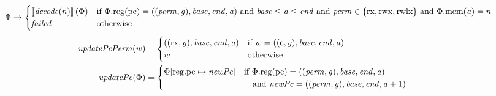 \documentclass[compsoc,conference,letterpaper,fleqn]{IEEEtran}
\newcommand{\update}[2]{[#1 \mapsto #2]}
\newcommand{\sem}[1]{\left\llbracket #1 \right\rrbracket}
\newcommand{\var}[1]{\mathit{#1}}
\newcommand{\gl}{\var{g}}
\newcommand{\pcreg}{\mathrm{pc}}
\newcommand{\addr}{\var{a}}
\newcommand{\start}{\var{base}}
\newcommand{\addrend}{\var{end}}
\newcommand{\perm}{\var{perm}}
\newcommand{\stdcap}[1][(\perm,\gl)]{\left(#1,\start,\addrend,\addr \right)}
\newcommand{\plainproj}[1]{\mathrm{#1}}
\newcommand{\memheap}[1][\Phi]{#1.\plainproj{mem}}
\newcommand{\memreg}[1][\Phi]{#1.\plainproj{reg}}
\newcommand{\updateReg}[3][\Phi]{#1\update{\plainproj{reg}.#2}{#3}}
\newcommand{\failed}{\mathit{failed}}
\newcommand{\plainfun}[2]{
  \ifthenelse{\equal{#2}{}}
  {\mathit{#1}}
  {\mathit{#1}(#2)}
}
\newcommand{\decode}{\plainfun{decode}{}}
\newcommand{\updatePcPerm}[1]{\plainfun{updatePcPerm}{#1}}
\newcommand{\stdUpdatePc}[1]{\plainfun{updatePc}{#1}}
\newcommand{\plainperm}[1]{\mathrm{#1}}
\newcommand{\exec}{\plainperm{rx}}
\newcommand{\entry}{\plainperm{e}}
\newcommand{\rwx}{\plainperm{rwx}}
\newcommand{\rwlx}{\plainperm{rwlx}}
\begin{document}
\begin{figure}
  \centering
  \begin{equation*}
    \Phi  \rightarrow
    \begin{cases}
      \sem{\decode(n)}(\Phi) & \text{if $\memreg(\pcreg) = \stdcap$ and $\start \leq \addr \leq \addrend$ and $\perm \in \{ \exec,\rwx, \rwlx \}$ and $\memheap(\addr) = n$ }\\
      \failed                                 & \text{otherwise}
    \end{cases}
  \end{equation*}\vspace{-.3cm}%
  \begin{align*}
    \updatePcPerm{w} &=
                       \begin{cases}
                         ((\exec,\gl),\start,\addrend,\addr) & \text{if $w = ((\entry,\gl),\start,\addrend,\addr)$}\\
                         w & \text{otherwise}
                       \end{cases}\\
    \stdUpdatePc{\Phi} &=
                         \begin{cases}
                           \updateReg{\pcreg}{\var{newPc}} & \arraycolsep=0pt
                           \begin{array}[t]{l}
                             \text{if $\memreg(\pcreg) = \stdcap$}\\
                             \quad\text{and $\var{newPc} = ((\perm,\gl),\start,\addrend,\addr + 1)$}\\
                           \end{array}
                         \end{cases}
  \end{align*}


\end{figure}
\end{document}
